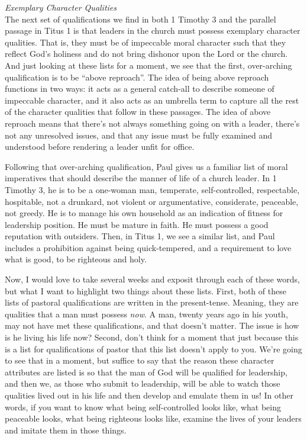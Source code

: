 \documentclass[letterpaper, 12pt]{article}
\begin{document}
    \noindent \emph{Exemplary Character Qualities} \\

    The next set of qualifications we find in both 1 Timothy 3 and the
    parallel passage in Titus 1 is that leaders in the church must
    possess exemplary character qualities. That is, they must be of
    impeccable moral character such that they reflect God's holiness and
    do not bring dishonor upon the Lord or the church. And just looking
    at these lists for a moment, we see that the first, over-arching
    qualification is to be ``above reproach''. The idea of being above
    reproach functions in two ways: it acts as a general catch-all to
    describe someone of impeccable character, and it also acts as an
    umbrella term to capture all the rest of the character qualities
    that follow in these passages. The idea of above reproach means that
    there's not always something going on with a leader, there's not
    any unresolved issues, and that any issue must be fully examined and
    understood before rendering a leader unfit for office.

    Following that over-arching qualification, Paul gives us a familiar
    list of moral imperatives that should describe the manner of life of
    a church leader. In 1 Timothy 3, he is to be a one-woman man,
    temperate, self-controlled, respectable, hospitable, not a drunkard,
    not violent or argumentative, considerate, peaceable, not greedy. He
    is to manage his own household as an indication of fitness for
    leadership position. He must be mature in faith. He must possess a
    good reputation with outsiders. Then, in Titus 1, we see a similar
    list, and Paul includes a prohibition against being quick-tempered,
    and a requirement to love what is good, to be righteous and holy.

    Now, I would love to take several weeks and exposit through each of
    these words, but what I want to highlight two things about these
    lists. First, both of these lists of pastoral qualifications are
    written in the present-tense. Meaning, they are qualities that a man
    must possess \emph{now}. A man, twenty years ago in his youth, may
    not have met these qualifications, and that doesn't matter. The
    issue is how is he living his life now? Second, don't think for a
    moment that just because this is a list for qualifications of pastor
    that this list doesn't apply to you. We're going to see that in a
    moment, but suffice to say that the reason these character
    attributes are listed is so that the man of God will be qualified
    for leadership, and then we, as those who submit to leadership, will
    be able to watch those qualities lived out in his life and then
    develop and emulate them in us! In other words, if you want to know
    what being self-controlled looks like, what being peaceable looks,
    what being righteous looks like, examine the lives of your leaders
    and imitate them in those things. \\
\end{document}
